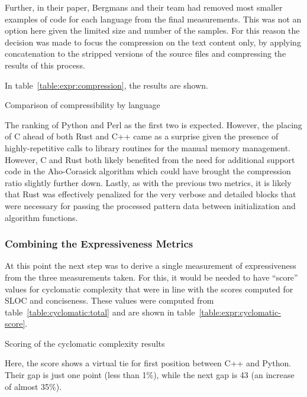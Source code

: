 Further, in their paper, Bergmans and their team had removed most smaller examples of code for each language from the final measurements. This was not an option here given the limited size and number of the samples. For this reason the decision was made to focus the compression on the text content only, by applying concatenation to the stripped versions of the source files and compressing the results of this process.

In table~\ref{table:expr:compression}, the results are shown.

\begin{table}[!htb]

\caption{Comparison of compressibility by language}
\label{table:expr:compression}
\end{table}

The ranking of Python and Perl as the first two is expected. However, the placing of C ahead of both Rust and C++ came as a surprise given the presence of highly-repetitive calls to library routines for the manual memory management. However, C and Rust both likely benefited from the need for additional support code in the Aho-Corasick algorithm which could have brought the compression ratio slightly further down. Lastly, as with the previous two metrics, it is likely that Rust was effectively penalized for the very verbose and detailed blocks that were necessary for passing the processed pattern data between initialization and algorithm functions.

\subsubsection{Combining the Expressiveness Metrics}

At this point the next step was to derive a single measurement of expressiveness from the three measurements taken. For this, it would be needed to have ``score'' values for cyclomatic complexity that were in line with the scores computed for SLOC and conciseness. These values were computed from table~\ref{table:cyclomatic:total} and are shown in table~\ref{table:expr:cyclomatic-score}.

\begin{table}[!htb]

\caption{Scoring of the cyclomatic complexity results}
\label{table:expr:cyclomatic-score}
\end{table}

Here, the score shows a virtual tie for first position between C++ and Python. Their gap is just one point (less than 1\%), while the next gap is 43 (an increase of almost 35\%).

